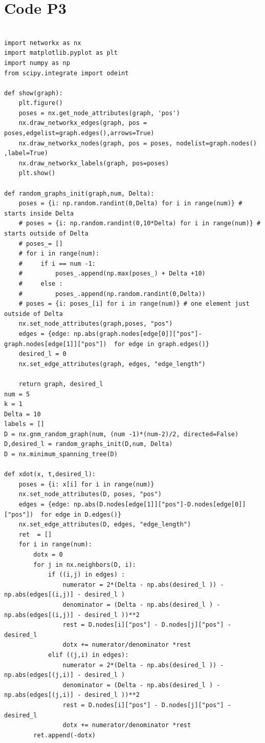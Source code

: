 \documentclass{article}
\begin{document}
\section*{Code P3}
\begin{verbatim}

import networkx as nx
import matplotlib.pyplot as plt
import numpy as np
from scipy.integrate import odeint

def show(graph): 
    plt.figure()
    poses = nx.get_node_attributes(graph, 'pos')
    nx.draw_networkx_edges(graph, pos = poses,edgelist=graph.edges(),arrows=True)
    nx.draw_networkx_nodes(graph, pos = poses, nodelist=graph.nodes() ,label=True)
    nx.draw_networkx_labels(graph, pos=poses)
    plt.show()

def random_graphs_init(graph,num, Delta):
    poses = {i: np.random.randint(0,Delta) for i in range(num)} # starts inside Delta
    # poses = {i: np.random.randint(0,10*Delta) for i in range(num)} # starts outside of Delta
    # poses_= []
    # for i in range(num):
    #     if i == num -1:
    #         poses_.append(np.max(poses_) + Delta +10)
    #     else :
    #         poses_.append(np.random.randint(0,Delta))
    # poses = {i: poses_[i] for i in range(num)} # one element just outside of Delta
    nx.set_node_attributes(graph,poses, "pos")
    edges = {edge: np.abs(graph.nodes[edge[0]]["pos"]-graph.nodes[edge[1]]["pos"])  for edge in graph.edges()}
    desired_l = 0
    nx.set_edge_attributes(graph, edges, "edge_length")
    
    return graph, desired_l
num = 5
k = 1
Delta = 10
labels = []
D = nx.gnm_random_graph(num, (num -1)*(num-2)/2, directed=False)
D,desired_l = random_graphs_init(D,num, Delta)
D = nx.minimum_spanning_tree(D)

def xdot(x, t,desired_l):
    poses = {i: x[i] for i in range(num)}
    nx.set_node_attributes(D, poses, "pos")
    edges = {edge: np.abs(D.nodes[edge[1]]["pos"]-D.nodes[edge[0]]["pos"])  for edge in D.edges()}
    nx.set_edge_attributes(D, edges, "edge_length")
    ret  = []
    for i in range(num):
        dotx = 0
        for j in nx.neighbors(D, i):
            if ((i,j) in edges) :
                numerator = 2*(Delta - np.abs(desired_l )) - np.abs(edges[(i,j)] - desired_l )
                denominator = (Delta - np.abs(desired_l ) - np.abs(edges[(i,j)] - desired_l ))**2
                rest = D.nodes[i]["pos"] - D.nodes[j]["pos"] - desired_l 
                dotx += numerator/denominator *rest
            elif ((j,i) in edges):
                numerator = 2*(Delta - np.abs(desired_l )) - np.abs(edges[(j,i)] - desired_l )
                denominator = (Delta - np.abs(desired_l ) - np.abs(edges[(j,i)] - desired_l ))**2
                rest = D.nodes[i]["pos"] - D.nodes[j]["pos"] - desired_l 
                dotx += numerator/denominator *rest
        ret.append(-dotx)


\end{verbatim}
\end{document}
